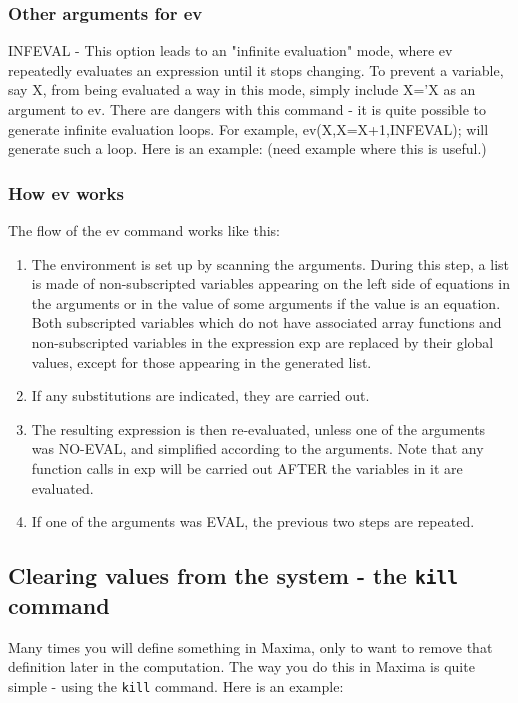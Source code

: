 \vspace{3ex}

\subsubsection{Other arguments for ev}

INFEVAL - This option leads to an "infinite evaluation" mode, where ev 
repeatedly evaluates an expression until it stops changing. To prevent a
variable, say X, from being evaluated a way in this mode, simply include 
X='X as an argument to ev. There are dangers with this command - it is 
quite possible to generate infinite evaluation loops. For example, 
ev(X,X=X+1,INFEVAL); will generate such a loop. Here is an example: (need
example where this is useful.)

\subsubsection{How ev works}

The flow of the ev command works like this:
\begin{enumerate}
\item The environment is set up by scanning the arguments.  During this 
step, a list is made of non-subscripted variables appearing on the left 
side of equations in the arguments or in the value of some arguments if 
the value is an equation.  Both subscripted variables which do not have 
associated array functions and non-subscripted variables in the 
expression exp are replaced by their global values, except for those 
appearing in the generated list.
\item If any substitutions are indicated, they are carried out.
\item The resulting expression is then re-evaluated, unless one of the 
      arguments was NO-EVAL, and simplified according to the arguments.  
      Note that any function calls in exp will be carried out AFTER the 
      variables in it are evaluated.
\item If one of the arguments was EVAL, the previous two steps are repeated.
\end{enumerate}

\subsection{Clearing values from the system - the \texttt{kill} command}

Many times you will define something in Maxima, only to want to remove 
that definition later in the computation.  The way you do this in Maxima 
is quite simple - using the \texttt{kill} command.  Here is an example:

